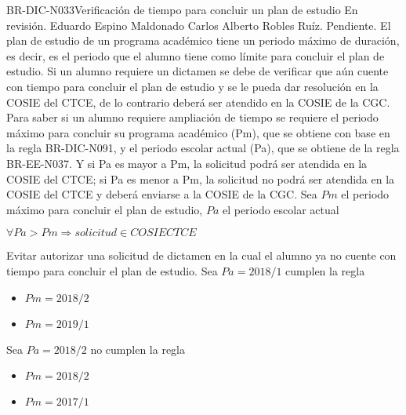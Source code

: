 \begin{BusinessRule}{BR-DIC-N033}{Verificación de tiempo para concluir un plan de estudio}
	{\bcCondition} %
	{\btEnabler}     %
	{\blControlling}     %
	\BRItem[Estado] En revisión.
	 Eduardo Espino Maldonado
	 Carlos Alberto Robles Ruíz.
	 Pendiente.
	\BRItem[Descripción] El plan de estudio de un programa académico tiene un periodo máximo de duración, es decir, es el periodo que el alumno tiene como límite para concluir el plan de estudio. Si un alumno requiere un dictamen se debe de verificar que aún cuente con tiempo para concluir el plan de estudio y se le pueda dar resolución en la COSIE del CTCE, de lo contrario deberá ser atendido en la COSIE de la CGC.
	Para saber si un alumno requiere ampliación de tiempo se requiere el periodo máximo para concluir su programa académico (Pm), que se obtiene con base en la regla BR-DIC-N091, y el periodo escolar actual (Pa), que se obtiene de la regla BR-EE-N037. Y si Pa es mayor a Pm, la solicitud podrá ser atendida en la COSIE del CTCE; si Pa es menor a Pm, la solicitud no podrá ser atendida en la COSIE del CTCE y deberá enviarse a la COSIE de la CGC.
	\BRItem[Sentencia] 
	Sea $Pm$ el periodo máximo para concluir el plan de estudio, $Pa$ el periodo escolar actual\\
	\begin{center}
		$ \forall Pa > Pm \Rightarrow solicitud \in COSIE CTCE $
	\end{center}
	
	\BRItem[Motivación] Evitar autorizar una solicitud de dictamen en la cual el alumno ya no cuente con tiempo para concluir el plan de estudio. 
	Sea $Pa = 2018/1$ cumplen la regla\\
	\begin{itemize}
		\item $Pm = 2018/2$
		\item $Pm = 2019/1$
	\end{itemize}  
	Sea $Pa = 2018/2$ no cumplen la regla\\
	\begin{itemize}
		\item $Pm = 2018/2$
		\item $Pm = 2017/1$
	\end{itemize}  
\end{BusinessRule}



